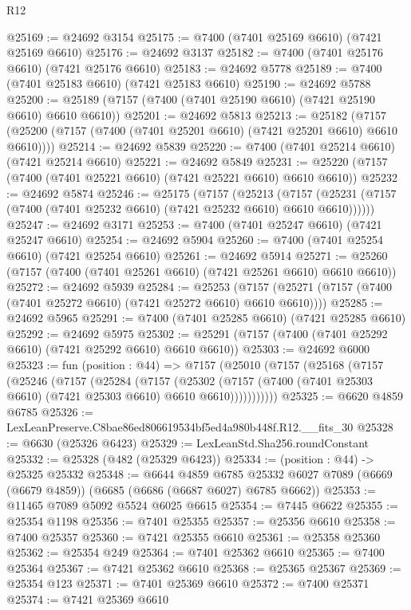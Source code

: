 \begin{lexlean}{R12}
\begin{coremodule}
@25169 := @24692 @3154
@25175 := @7400 (@7401 @25169 @6610) (@7421 @25169 @6610)
@25176 := @24692 @3137
@25182 := @7400 (@7401 @25176 @6610) (@7421 @25176 @6610)
@25183 := @24692 @5778
@25189 := @7400 (@7401 @25183 @6610) (@7421 @25183 @6610)
@25190 := @24692 @5788
@25200 := @25189 (@7157 (@7400 (@7401 @25190 @6610) (@7421 @25190 @6610) @6610 @6610))
@25201 := @24692 @5813
@25213 := @25182
    (@7157 (@25200 (@7157 (@7400 (@7401 @25201 @6610) (@7421 @25201 @6610) @6610 @6610))))
@25214 := @24692 @5839
@25220 := @7400 (@7401 @25214 @6610) (@7421 @25214 @6610)
@25221 := @24692 @5849
@25231 := @25220 (@7157 (@7400 (@7401 @25221 @6610) (@7421 @25221 @6610) @6610 @6610))
@25232 := @24692 @5874
@25246 := @25175
    (@7157
      (@25213
        (@7157 (@25231 (@7157 (@7400 (@7401 @25232 @6610) (@7421 @25232 @6610) @6610 @6610))))))
@25247 := @24692 @3171
@25253 := @7400 (@7401 @25247 @6610) (@7421 @25247 @6610)
@25254 := @24692 @5904
@25260 := @7400 (@7401 @25254 @6610) (@7421 @25254 @6610)
@25261 := @24692 @5914
@25271 := @25260 (@7157 (@7400 (@7401 @25261 @6610) (@7421 @25261 @6610) @6610 @6610))
@25272 := @24692 @5939
@25284 := @25253
    (@7157 (@25271 (@7157 (@7400 (@7401 @25272 @6610) (@7421 @25272 @6610) @6610 @6610))))
@25285 := @24692 @5965
@25291 := @7400 (@7401 @25285 @6610) (@7421 @25285 @6610)
@25292 := @24692 @5975
@25302 := @25291 (@7157 (@7400 (@7401 @25292 @6610) (@7421 @25292 @6610) @6610 @6610))
@25303 := @24692 @6000
@25323 := fun (position : @44) =>
  @7157
    (@25010
      (@7157
        (@25168
          (@7157
            (@25246
              (@7157
                (@25284
                  (@7157
                    (@25302
                      (@7157 (@7400 (@7401 @25303 @6610) (@7421 @25303 @6610) @6610 @6610)))))))))))
@25325 := @6620 @4859 @6785
@25326 := LexLeanPreserve.C8bae86ed806619534bf5ed4a980b448f.R12.__fits_30
@25328 := @6630 (@25326 @6423)
@25329 := LexLeanStd.Sha256.roundConstant
@25332 := @25328 (@482 (@25329 @6423))
@25334 := (position : @44) -> @25325 @25332
@25348 := @6644
    @4859
    @6785
    @25332
    @6027
    @7089
    (@6669 (@6679 @4859))
    (@6685 (@6686 (@6687 @6027) @6785 @6662))
@25353 := @11465 @7089 @5092 @5524 @6025 @6615
@25354 := @7445 @6622
@25355 := @25354 @1198
@25356 := @7401 @25355
@25357 := @25356 @6610
@25358 := @7400 @25357
@25360 := @7421 @25355 @6610
@25361 := @25358 @25360
@25362 := @25354 @249
@25364 := @7401 @25362 @6610
@25365 := @7400 @25364
@25367 := @7421 @25362 @6610
@25368 := @25365 @25367
@25369 := @25354 @123
@25371 := @7401 @25369 @6610
@25372 := @7400 @25371
@25374 := @7421 @25369 @6610

\end{coremodule}
\end{lexlean}
